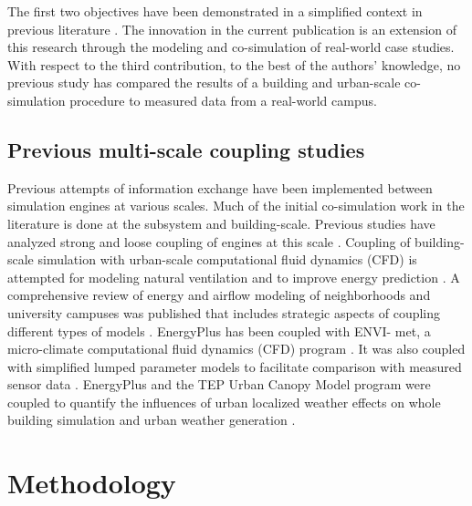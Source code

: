 \documentclass{tBPS2e}
\theoremstyle{plain}
\theoremstyle{definition}
\theoremstyle{remark}
\newcommand{\noteDT}[1]{\footnote{\textcolor{green}{#1}}}
\begin{document}

The first two objectives have been demonstrated in a simplified context in
previous literature \citep{thomas2014multiscale,Miller:2015vk}. The innovation
in the current publication is an extension of this research through the
modeling and co-simulation of real-world case studies. With respect to the
third contribution, to the best of the authors' knowledge, no previous study
has compared the results of a building and urban-scale co-simulation procedure
to measured data from a real-world campus.%

\subsection{Previous multi-scale coupling studies}
Previous attempts of information exchange have been implemented between
simulation engines at various scales. Much of the initial co-simulation work
in the literature is done at the subsystem and building-scale. Previous studies
have analyzed strong and loose coupling of engines at this scale
\citep{Trcka:2010cr,Wetter:2011kh}. Coupling of building-scale simulation with
urban-scale computational fluid dynamics (CFD) is attempted for modeling
natural ventilation \citep{Zhang:2013vx} and to improve energy prediction
\citep{Bouyer:2011eha}. A comprehensive review of energy and airflow modeling
of neighborhoods and university campuses was published that includes
strategic aspects of coupling different %
types of models \citep{Srebric:2015gq}. EnergyPlus has been coupled with ENVI-
met, a micro-climate computational fluid dynamics (CFD) program
\citep{Yang:2012cr}. It was also coupled with simplified lumped parameter
models to facilitate comparison with measured sensor data
\citep{Martin:2015fj}. EnergyPlus and the TEP Urban Canopy Model program were
coupled to quantify the influences of urban localized weather effects
on whole building simulation \citep{Bueno:2011hi} and urban weather generation
\citep{Bueno:2013hh}.

\section{Methodology}\label{Methodology}
\end{document}
